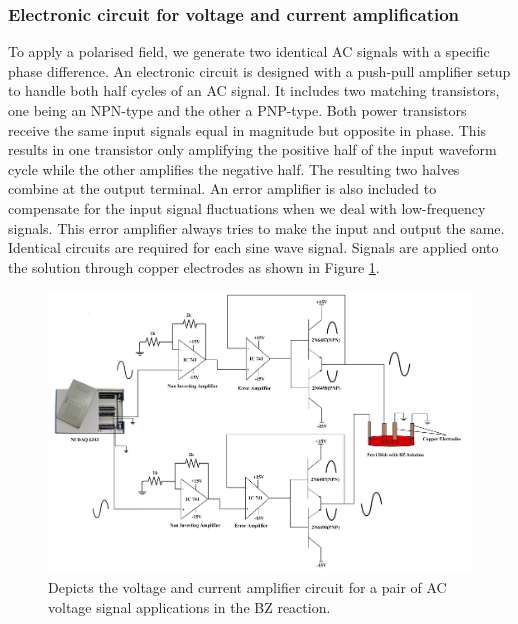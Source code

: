 \documentclass[journal=jacsat,manuscript=article]{achemso}
\begin{document}
\subsubsection{Electronic circuit for voltage and current amplification}
To apply a polarised field, we generate two identical AC signals with a specific phase difference. An electronic circuit is designed with a push-pull amplifier setup to handle both half cycles of an AC signal. 
It includes two matching transistors, one being an NPN-type and the other a PNP-type. Both power transistors receive the same input signals equal in magnitude but opposite in phase. This results in one transistor only amplifying the positive half of the input waveform cycle while the other amplifies the negative half. The resulting two halves combine at the output terminal. An error amplifier is also included to compensate for the input signal fluctuations when we deal with low-frequency signals. This error amplifier always tries to make the input and output the same. Identical circuits are required for each sine wave signal. Signals are applied onto the solution through copper electrodes as shown in Figure \ref{fig:ex6}. 
\begin{figure}[H]
    \centering
    \includegraphics[width=\linewidth]{CPEF - Copy.jpg}
    \caption{Depicts the voltage and current amplifier circuit for a pair of AC voltage signal applications in the BZ reaction.}
    \label{fig:ex6}
\end{figure}
\end{document}
